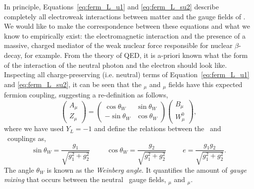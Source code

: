 In principle, Equations~\ref{eq:ferm_L_u1} and \ref{eq:ferm_L_su2} describe completely
all electroweak interactions
between matter and the gauge fields of \SUewk. We would like to make the correspondence
between these equations and what we know to empirically exist: the electromagnetic interaction
and the presence of a massive, charged mediator of the weak nuclear force responsible
for nuclear $\beta$-decay, for example. From the theory of QED, it is a-priori known what the
form of the interaction of the neutral photon and the electron should look like.
Inspecting all charge-preserving (i.e. neutral) terms of Equation~\ref{eq:ferm_L_u1} and \ref{eq:ferm_L_su2},
it can be seen that the \fieldB$_{\mu}$ and \fieldWzero$_{\mu}$ fields have this expected
fermion coupling, suggesting a re-definition as follows,
\begin{equation}
	\left( \begin{matrix} A_{\mu} \\ Z_{\mu} \end{matrix} \right) = \left( \begin{matrix} \cos \theta_W & \sin \theta_W \\ -\sin \theta_W & \cos \theta_W \end{matrix} \right) \left( \begin{matrix} B_{\mu} \\ W_{\mu}^0 \end{matrix} \right),
	\label{eq:su2rotation}
\end{equation}
where we have used $Y_L = -1$ and define the relations between the \SUtwo~and \Uone~couplings as,
\begin{equation}
\sin \theta_W = \frac{g_1}{\sqrt{g_1^2 + g_2^2}} \hspace{1cm} \cos \theta_W = \frac{g_2}{\sqrt{g_1^2 + g_2^2}} \hspace{1cm} e = \frac{g_1 g_2}{\sqrt{g_1^2 + g_2^2}}.
\label{eq:weinberg_angles}
\end{equation}
The angle $\theta_W$  is known as the \textit{Weinberg angle}. It quantifies the amount of
\textit{gauge mixing} that occurs between the neutral
\SUewk~gauge fields, \fieldB$_{\mu}$ and \fieldWzero$_{\mu}$.

